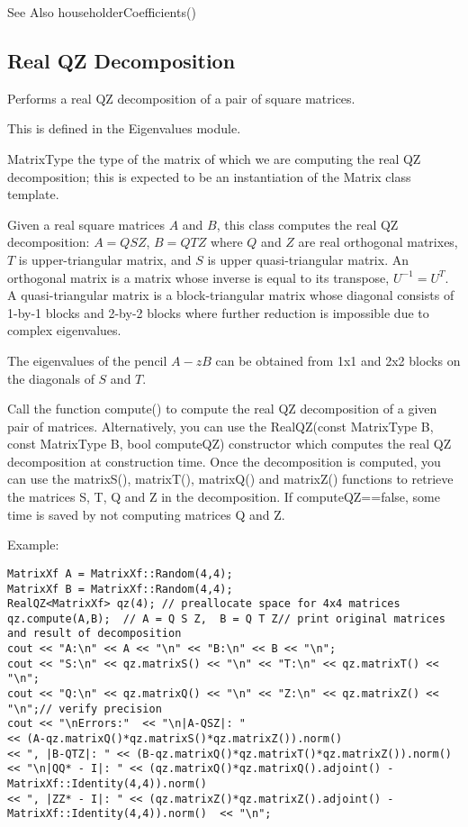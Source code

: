 See Also householderCoefficients() 













\newpage
\subsection{Real QZ Decomposition}
\label{Real QZ Decomposition}

Performs a real QZ decomposition of a pair of square matrices. 

This is defined in the Eigenvalues module.

MatrixType the type of the matrix of which we are computing the real QZ decomposition; this is expected to be an instantiation of the Matrix class template. 

Given a real square matrices $A$ and $B$, this class computes the real QZ decomposition: $ A = Q S Z$, $B = Q T Z$  where $Q$ and $Z$ are real orthogonal matrixes, $T$ is upper-triangular matrix, and $S$ is upper quasi-triangular matrix. An orthogonal matrix is a matrix whose inverse is equal to its transpose, $U^{-1} = U^T$. A quasi-triangular matrix is a block-triangular matrix whose diagonal consists of 1-by-1 blocks and 2-by-2 blocks where further reduction is impossible due to complex eigenvalues.

The eigenvalues of the pencil $A - zB$ can be obtained from 1x1 and 2x2 blocks on the diagonals of $S$ and $T$.

Call the function compute() to compute the real QZ decomposition of a given pair of matrices. Alternatively, you can use the RealQZ(const MatrixType B, const MatrixType B, bool computeQZ) constructor which computes the real QZ decomposition at construction time. Once the decomposition is computed, you can use the matrixS(), matrixT(), matrixQ() and matrixZ() functions to retrieve the matrices S, T, Q and Z in the decomposition. If computeQZ==false, some time is saved by not computing matrices Q and Z.


Example:
\begin{lstlisting}
MatrixXf A = MatrixXf::Random(4,4);
MatrixXf B = MatrixXf::Random(4,4);
RealQZ<MatrixXf> qz(4); // preallocate space for 4x4 matrices
qz.compute(A,B);  // A = Q S Z,  B = Q T Z// print original matrices and result of decomposition
cout << "A:\n" << A << "\n" << "B:\n" << B << "\n";
cout << "S:\n" << qz.matrixS() << "\n" << "T:\n" << qz.matrixT() << "\n";
cout << "Q:\n" << qz.matrixQ() << "\n" << "Z:\n" << qz.matrixZ() << "\n";// verify precision
cout << "\nErrors:"  << "\n|A-QSZ|: " 
<< (A-qz.matrixQ()*qz.matrixS()*qz.matrixZ()).norm()  
<< ", |B-QTZ|: " << (B-qz.matrixQ()*qz.matrixT()*qz.matrixZ()).norm()  
<< "\n|QQ* - I|: " << (qz.matrixQ()*qz.matrixQ().adjoint() - MatrixXf::Identity(4,4)).norm()  
<< ", |ZZ* - I|: " << (qz.matrixZ()*qz.matrixZ().adjoint() - MatrixXf::Identity(4,4)).norm()  << "\n";
\end{lstlisting}

